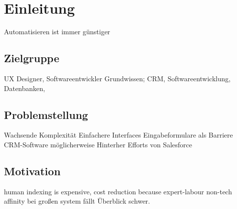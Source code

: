 \chapter{Einleitung}
Automatisieren ist immer günstiger
\section{Zielgruppe}
UX Designer, Softwareentwickler
Grundwissen; CRM, Softwareentwicklung, Datenbanken, 
\section{Problemstellung}
Wachsende Komplexität
Einfachere Interfaces
Eingabeformulare als Barriere
CRM-Software möglicherweise Hinterher
Efforts von Salesforce

\section{Motivation}
human indexing is expensive, cost reduction because expert-labour \cite{shneiderman}
non-tech affinity 
bei großen system fällt Überblick schwer.
